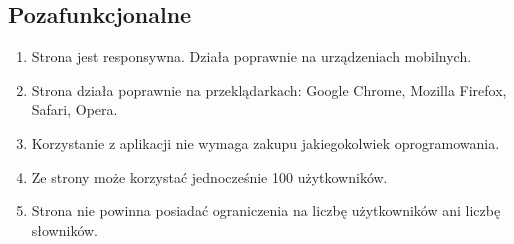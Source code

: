 \documentclass[a4paper,10pt]{article}
\begin{document}
\subsection{Pozafunkcjonalne}
\begin{enumerate}
\item Strona jest responsywna. Działa poprawnie na urządzeniach mobilnych.
\item Strona działa poprawnie na przeklądarkach: Google Chrome, Mozilla Firefox, Safari, Opera.
\item Korzystanie z aplikacji nie wymaga zakupu jakiegokolwiek oprogramowania.
\item Ze strony może korzystać jednocześnie 100 użytkowników.
\item Strona nie powinna posiadać ograniczenia na liczbę użytkowników ani liczbę słowników. 
\end{enumerate}
\end{document}
